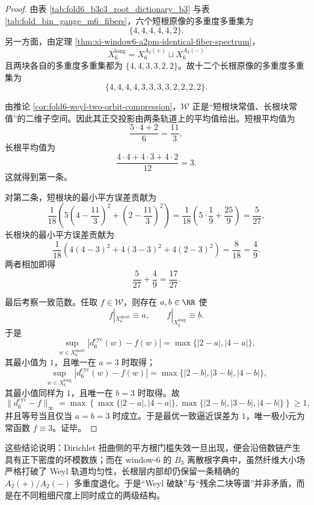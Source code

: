 \begin{proof}
由表 \ref{tab:fold6_b3c3_root_dictionary_b3} 与表 \ref{tab:fold_bin_gauge_m6_fibers}，六个短根原像的多重度多重集为
\[
\{4,4,4,4,4,2\}.
\]
另一方面，由定理 \ref{thm:xi-window6-a2pm-identical-fiber-spectrum}，
\[
X_6^{\mathrm{long}}=X_6^{A_2(+)}\sqcup X_6^{A_2(-)}
\]
且两块各自的多重度多重集都为 \(\{4,4,3,3,2,2\}\)。故十二个长根原像的多重度多重集为
\[
\{4,4,4,4,3,3,3,3,2,2,2,2\}.
\]

由推论 \ref{cor:fold6-weyl-two-orbit-compression}，\(\mathcal W\) 正是“短根块常值、长根块常值”的二维子空间。因此其正交投影由两条轨道上的平均值给出。短根平均值为
\[
\frac{5\cdot 4+2}{6}=\frac{11}{3},
\]
长根平均值为
\[
\frac{4\cdot 4+4\cdot 3+4\cdot 2}{12}=3.
\]
这就得到第一条。

对第二条，短根块的最小平方误差贡献为
\[
\frac{1}{18}\left(
5\left(4-\frac{11}{3}\right)^2+\left(2-\frac{11}{3}\right)^2
\right)
=
\frac{1}{18}\left(5\cdot \frac{1}{9}+\frac{25}{9}\right)
=
\frac{5}{27},
\]
长根块的最小平方误差贡献为
\[
\frac{1}{18}\left(
4(4-3)^2+4(3-3)^2+4(2-3)^2
\right)
=
\frac{8}{18}
=
\frac{4}{9}.
\]
两者相加即得
\[
\frac{5}{27}+\frac{4}{9}=\frac{17}{27}.
\]

最后考察一致范数。任取 \(f\in\mathcal W\)，则存在 \(a,b\in\RR\) 使
\[
f|_{X_6^{\mathrm{short}}}\equiv a,
\qquad
f|_{X_6^{\mathrm{long}}}\equiv b.
\]
于是
\[
\sup_{w\in X_6^{\mathrm{short}}}|d_6^{\mathrm{cyc}}(w)-f(w)|
=
\max\{|2-a|,|4-a|\},
\]
其最小值为 \(1\)，且唯一在 \(a=3\) 时取得；
\[
\sup_{w\in X_6^{\mathrm{long}}}|d_6^{\mathrm{cyc}}(w)-f(w)|
=
\max\{|2-b|,|3-b|,|4-b|\},
\]
其最小值同样为 \(1\)，且唯一在 \(b=3\) 时取得。故
\[
\|d_6^{\mathrm{cyc}}-f\|_\infty
=
\max\left\{
\max\{|2-a|,|4-a|\},
\max\{|2-b|,|3-b|,|4-b|\}
\right\}
\ge 1,
\]
并且等号当且仅当 \(a=b=3\) 时成立。于是最优一致逼近误差为 \(1\)，唯一极小元为常函数 \(f\equiv 3\)。证毕。
\end{proof}

\noindent
这些结论说明：Dirichlet 扭曲侧的平方根门槛失效一旦出现，便会沿倍数链产生具有正下密度的坏模数族；而在 window-\(6\) 的 \(B_3\) 离散根字典中，虽然纤维大小场严格打破了 Weyl 轨道均匀性，长根层内部却仍保留一条精确的 \(A_2(+)/A_2(-)\) 多重度退化。于是“Weyl 破缺”与“残余二块等谱”并非矛盾，而是在不同粗细尺度上同时成立的两级结构。

\endinput
